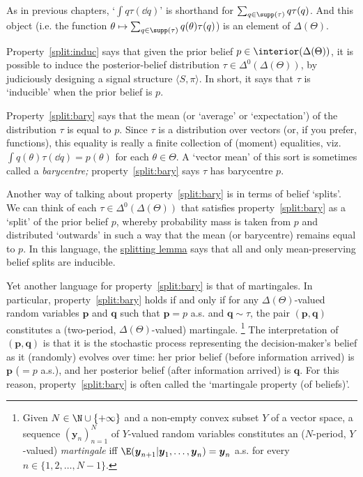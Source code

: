 As in previous chapters, `$\int q \tau( \dd q )$' is shorthand for $\sum_{q \in \supp(\tau)} q \tau(q)$. And this object (i.e. the function $\theta \mapsto \sum_{q \in \supp(\tau)} q(\theta) \tau(q)$) is an element of $\Delta(\Theta)$.

Property~\ref{split:induc} says that given the prior belief $p \in \interior(\Delta(\Theta))$, it is possible to induce the posterior-belief distribution $\tau \in \Delta^0(\Delta(\Theta))$, by judiciously designing a signal structure $\langle S, \pi \rangle $. In short, it says that $\tau$ is `inducible' when the prior belief is $p$.

Property~\ref{split:bary} says that the mean (or `average' or `expectation') of the distribution $\tau$ is equal to $p$. Since $\tau$ is a distribution over vectors (or, if you prefer, functions), this equality is really a finite collection of (moment) equalities, viz. $\int q(\theta) \tau( \dd q ) = p(\theta)$ for each $\theta \in \Theta$. A `vector mean' of this sort is sometimes called a \emph{barycentre;} property~\ref{split:bary} says $\tau$ has barycentre $p$.

Another way of talking about property~\ref{split:bary} is in terms of belief `splits'. We can think of each $\tau \in \Delta^0(\Delta(\Theta))$ that satisfies property~\ref{split:bary} as a `split' of the prior belief $p$, whereby probability mass is taken from $p$ and distributed `outwards' in such a way that the mean (or barycentre) remains equal to $p$. In this language, the \hyperref[lemma:split]{splitting lemma} says that all and only mean-preserving belief splits are inducible.

Yet another language for property~\ref{split:bary} is that of martingales. In particular, property~\ref{split:bary} holds if and only if for any $\Delta(\Theta)$-valued random variables $\boldsymbol{p}$ and $\boldsymbol{q}$ such that $\boldsymbol{p}=p$ a.s. and $\boldsymbol{q} \sim \tau$, the pair $(\boldsymbol{p},\boldsymbol{q})$ constitutes a (two-period, $\Delta(\Theta)$-valued) martingale.%
	\footnote{Given $N \in \N \cup \{+\infty\}$ and a non-empty convex subset $Y$ of a vector space, a sequence $(\boldsymbol{y}_n)_{n=1}^N$ of $Y$-valued random variables constitutes an ($N$-period, $Y$-valued) \emph{martingale} iff $\E( \boldsymbol{y}_{n+1} | \boldsymbol{y}_1, \dots, \boldsymbol{y}_n ) = \boldsymbol{y}_n$ a.s. for every $n \in \{1,2,\dots,N-1\}$.}
The interpretation of $(\boldsymbol{p},\boldsymbol{q})$ is that it is the stochastic process representing the decision-maker's belief as it (randomly) evolves over time: her prior belief (before information arrived) is $\boldsymbol{p}$ ($=p$ a.s.), and her posterior belief (after information arrived) is $\boldsymbol{q}$. For this reason, property~\ref{split:bary} is often called the `martingale property (of beliefs)'.

